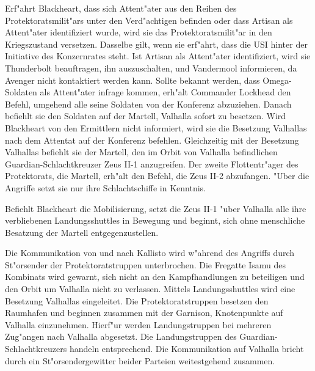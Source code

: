 
Erf"ahrt Blackheart, dass sich Attent"ater aus den Reihen des Protektoratsmilit"ars unter den Verd"achtigen befinden oder dass Artisan als Attent"ater identifiziert wurde, wird sie das Protektoratsmilit"ar in den Kriegszustand versetzen. Dasselbe gilt, wenn sie erf"ahrt, dass die USI hinter der Initiative des Konzernrates steht. Ist Artisan als Attent"ater identifiziert, wird sie Thunderbolt beauftragen, ihn auszuschalten, und Vandermool informieren, da Avenger nicht kontaktiert werden kann. Sollte bekannt werden, dass Omega-Soldaten als Attent"ater infrage kommen, erh"alt Commander Lockhead den Befehl, umgehend alle seine Soldaten von der Konferenz abzuziehen. Danach befiehlt sie den Soldaten auf der Martell, Valhalla sofort zu besetzen. Wird Blackheart von den Ermittlern nicht informiert, wird sie die Besetzung Valhallas nach dem Attentat auf der Konferenz befehlen. Gleichzeitig mit der Besetzung Valhallas befiehlt sie der Martell, den im Orbit von Valhalla befindlichen Guardian-Schlachtkreuzer Zeus II-1 anzugreifen. Der zweite Flottentr"ager des Protektorats, die Martell, erh"alt den Befehl, die Zeus II-2 abzufangen. "Uber die Angriffe setzt sie nur ihre Schlachtschiffe in Kenntnis.

Befiehlt Blackheart die Mobilisierung, setzt die Zeus II-1 "uber Valhalla alle ihre verbliebenen Landungsshuttles in Bewegung und beginnt, sich ohne menschliche Besatzung der Martell entgegenzustellen.

Die Kommunikation von und nach Kallisto wird w"ahrend des Angriffs durch St"orsender der Protektoratstruppen unterbrochen. Die Fregatte Isamu des Kombinats wird gewarnt, sich nicht an den Kampfhandlungen zu beteiligen und den Orbit um Valhalla nicht zu verlassen. Mittels Landungsshuttles wird eine Besetzung Valhallas eingeleitet. Die Protektoratstruppen besetzen den Raumhafen und beginnen zusammen mit der Garnison, Knotenpunkte auf Valhalla einzunehmen. Hierf"ur werden Landungstruppen bei mehreren Zug"angen nach Valhalla abgesetzt. Die Landungstruppen des Guardian-Schlachtkreuzers handeln entsprechend. Die Kommunikation auf Valhalla bricht durch ein St"orsendergewitter beider Parteien weitestgehend zusammen. 

